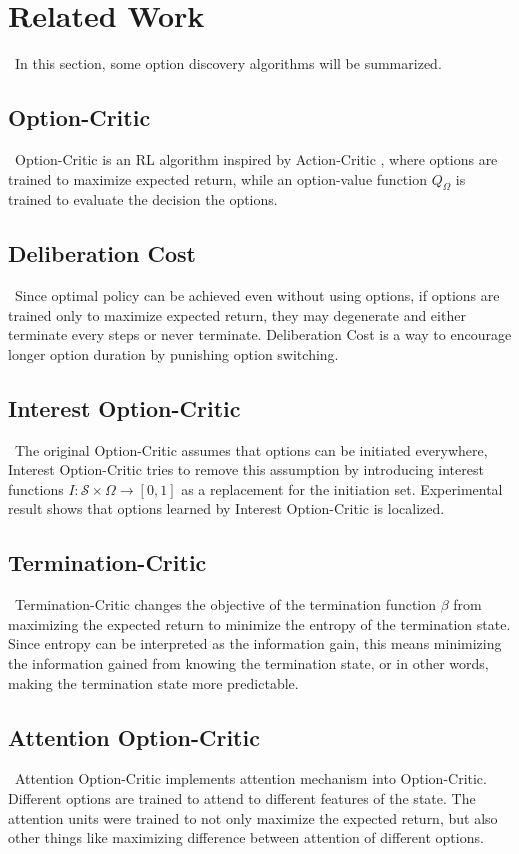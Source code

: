 \documentclass{article}
\begin{document}
	\section{Related Work}
	\qquad \ In this section, some option discovery algorithms will be summarized.
	\subsection*{Option-Critic}
	\qquad \ Option-Critic \cite{bacon2016optioncritic} is an RL algorithm inspired by Action-Critic \cite{Konda00actor-criticalgorithms}, where options are trained to maximize expected return, while an option-value function $Q_\Omega$ is trained to evaluate the decision the options.
	\subsection*{Deliberation Cost}
	\qquad \ Since optimal policy can be achieved even without using options, if options are trained only to maximize expected return, they may degenerate and either terminate every steps or never terminate. Deliberation Cost \cite{harb2017waiting} is a way to encourage longer option duration by punishing option switching.
	\subsection*{Interest Option-Critic}
	\qquad \ The original Option-Critic assumes that options can be initiated everywhere, Interest Option-Critic \cite{khetarpal2020options} tries to remove this assumption by introducing interest functions $I:\mathcal{S} \times \Omega \rightarrow [0,1]$ as a replacement for the initiation set. Experimental result shows that options learned by Interest Option-Critic is localized.
	\subsection*{Termination-Critic}
	\qquad \ Termination-Critic \cite{harutyunyan2019termination} changes the objective of the termination function $\beta$ from maximizing the expected return to minimize the entropy of the termination state. Since entropy can be interpreted as the information gain, this means minimizing the information gained from knowing the termination state, or in other words, making the termination state more predictable.
	\subsection*{Attention Option-Critic}
	\qquad \ Attention Option-Critic \cite{attentionoptioncritic} implements attention mechanism into Option-Critic. Different options are trained to attend to different features of the state. The attention units were trained to not only maximize the expected return, but also other things like maximizing difference between attention of different options.
\end{document}
